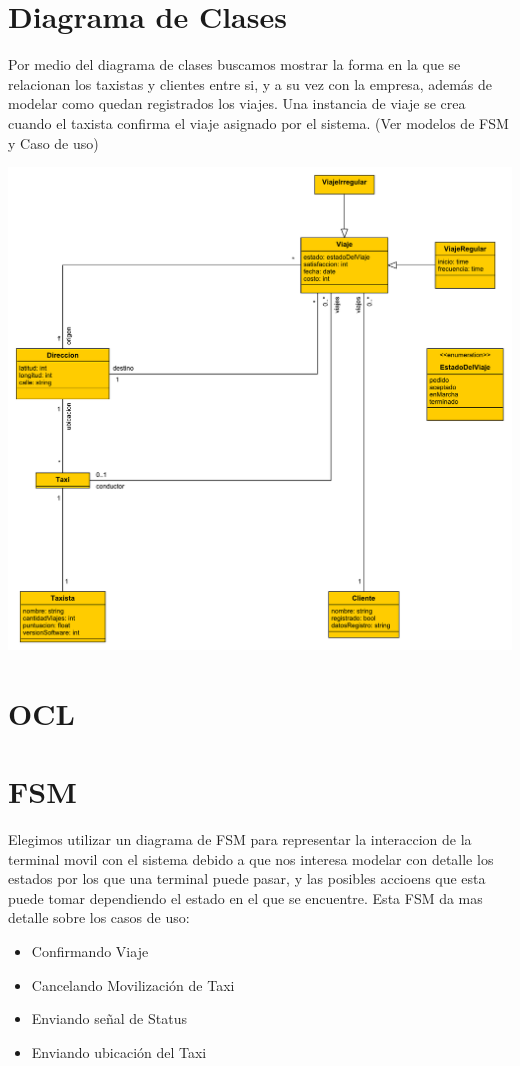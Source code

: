 \documentclass[a4paper]{article}
\begin{document}
\newpage
\section{Diagrama de Clases}
Por medio del diagrama de clases buscamos mostrar la forma en la que se relacionan los taxistas y clientes entre si, y a su vez con la empresa, adem\'as
de modelar como quedan registrados los viajes. Una instancia de viaje se crea cuando el taxista confirma el viaje asignado por el sistema. (Ver modelos de FSM y Caso de uso)


\begin{center}
\includegraphics[scale=.38]{diag_Clases.pdf}
\end{center}

\newpage
\section{OCL}


\section{FSM}

Elegimos utilizar un diagrama de FSM para representar la interaccion de la terminal movil con el sistema debido a que nos interesa modelar
con detalle los estados por los que una terminal puede pasar, y las posibles accioens que esta puede tomar dependiendo el estado en el que se encuentre.
Esta FSM da mas detalle sobre los casos de uso:
\begin{itemize}
\item Confirmando Viaje
\item Cancelando Movilizaci\'on de Taxi
\item Enviando se\~nal de Status
\item Enviando ubicaci\'on del Taxi
\end{itemize}
\end{document}

